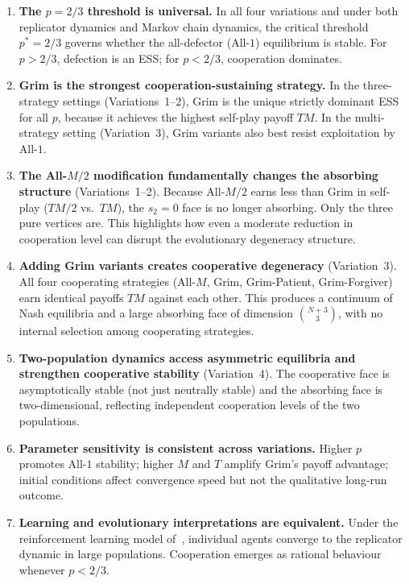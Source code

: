 \documentclass[12pt,a4paper]{article}
\begin{document}
\begin{enumerate}
  \item \textbf{The $p=2/3$ threshold is universal.} In all four variations and
        under both replicator dynamics and Markov chain dynamics, the critical
        threshold $p^*=2/3$ governs whether the all-defector (All-$1$)
        equilibrium is stable. For $p>2/3$, defection is an ESS; for $p<2/3$,
        cooperation dominates.

  \item \textbf{Grim is the strongest cooperation-sustaining strategy.} In the
        three-strategy settings (Variations~1--2), Grim is the unique strictly
        dominant ESS for all $p$, because it achieves the highest self-play
        payoff $TM$. In the multi-strategy setting (Variation~3), Grim variants
        also best resist exploitation by All-$1$.

  \item \textbf{The All-$M/2$ modification fundamentally changes the absorbing
        structure} (Variations~1--2). Because All-$M/2$ earns less than Grim in
        self-play ($TM/2$ vs.\ $TM$), the $s_2=0$ face is no longer absorbing.
        Only the three pure vertices are. This highlights how even a moderate
        reduction in cooperation level can disrupt the evolutionary degeneracy
        structure.

  \item \textbf{Adding Grim variants creates cooperative degeneracy}
        (Variation~3). All four cooperating strategies (All-$M$, Grim,
        Grim-Patient, Grim-Forgiver) earn identical payoffs $TM$ against each
        other. This produces a continuum of Nash equilibria and a large absorbing
        face of dimension $\binom{N+3}{3}$, with no internal selection among
        cooperating strategies.

  \item \textbf{Two-population dynamics access asymmetric equilibria and
        strengthen cooperative stability} (Variation~4). The cooperative face is
        asymptotically stable (not just neutrally stable) and the absorbing face
        is two-dimensional, reflecting independent cooperation levels of the two
        populations.

  \item \textbf{Parameter sensitivity is consistent across variations.} Higher
        $p$ promotes All-$1$ stability; higher $M$ and $T$ amplify Grim's payoff
        advantage; initial conditions affect convergence speed but not the
        qualitative long-run outcome.

  \item \textbf{Learning and evolutionary interpretations are equivalent.}
        Under the reinforcement learning model of~\cite{BorgersSarin1997},
        individual agents converge to the replicator dynamic in large populations.
        Cooperation emerges as rational behaviour whenever $p < 2/3$.
\end{enumerate}
\end{document}
